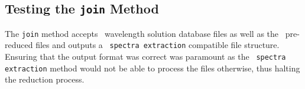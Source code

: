 

\subsection{Testing the \texttt{join} Method} \label{subsec:test_join}

The \texttt{join} method accepts \iraf\ wavelength solution database files as well as the \polsalt\ pre-reduced files and outputs a \polsalt\ \texttt{spectra extraction} compatible file structure. Ensuring that the output format was correct was paramount as the \polsalt\ \texttt{spectra extraction} method would not be able to process the files otherwise, thus halting the reduction process.




